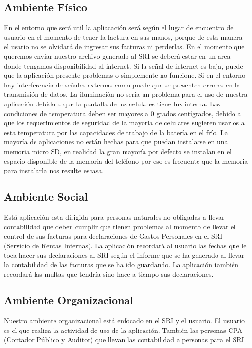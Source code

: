 \documentclass[a4paper,11pt]{article}
\begin{document}
     \subsection{ Ambiente Físico}
En el entorno que será util la apliacación será según el lugar de encuentro del usuario en el momento de tener la factura en sus manos, porque de esta manera el usario no se olvidará de ingresar sus facturas ni perderlas.
En el momento que queremos enviar nuestro archivo generado al  SRI se deberá estar en un area donde tengamos disponibilidad al internet. Si la señal de internet es baja, puede que la aplicación presente problemas o simplemente no funcione.
Si en el entorno hay interferencia de señales externas como puede que se presenten errores en la transmisión de datos.
 La iluminación no sería un problema para el uso de nuestra aplicación debido a que la pantalla de los celulares tiene luz interna.
 Las condiciones de temperatura deben ser mayores a 0 grados centígrados, debido a que los requerimientos de seguridad de la mayoría de celulares sugieren usarlos a esta temperatura por las capacidades  de trabajo de la batería en el frío.
La mayoría de aplicaciones no están hechas para que puedan instalarse en una memoria micro SD, en realidad la gran mayoría por defecto se instalan en el espacio disponible de la memoria del teléfono por eso es frecuente que la memoria para instalarla nos resulte escasa.

    \subsection{ Ambiente Social}
Está aplicación esta dirigida  para personas naturales no obligadas a llevar contabilidad que deben cumplir que tienen problemas al momento de llevar el control de sus facturas para declaraciones de Gastos Personales en el SRI (Servicio de Rentas Internas).
La aplicación recordará al usuario las fechas que le toca hacer sus declaraciones al SRI según el informe que se ha generado al llevar la contabilidad de las facturas que se ha ido guardando. La aplicación también recordará las multas que tendría sino hace a tiempo sus declaraciones. 

   \subsection{ Ambiente Organizacional}
Nuestro ambiente organizacional está enfocado en el SRI y el usuario. El usuario es el que realiza la actividad de uso de la aplicación. También las personas CPA (Contador Público y Auditor) que llevan las contabilidad a personas para el SRI
\end{document}
